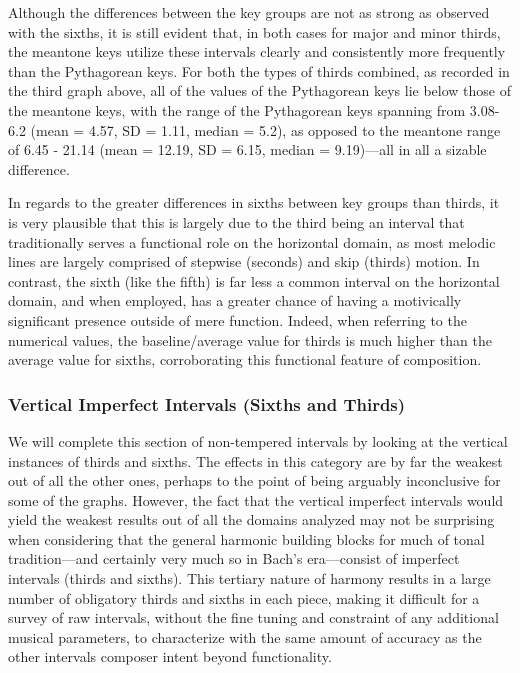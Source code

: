     Although the differences between the key groups are not as strong as
observed with the sixths, it is still evident that, in both cases for
major and minor thirds, the meantone keys utilize these intervals
clearly and consistently more frequently than the Pythagorean keys. For
both the types of thirds combined, as recorded in the third graph above,
all of the values of the Pythagorean keys lie below those of the
meantone keys, with the range of the Pythagorean keys spanning from
3.08-6.2 (mean = 4.57, SD = 1.11, median = 5.2), as opposed to the
meantone range of 6.45 - 21.14 (mean = 12.19, SD = 6.15, median =
9.19)---all in all a sizable difference.

In regards to the greater differences in sixths between key groups than
thirds, it is very plausible that this is largely due to the third being
an interval that traditionally serves a functional role on the
horizontal domain, as most melodic lines are largely comprised of
stepwise (seconds) and skip (thirds) motion. In contrast, the sixth
(like the fifth) is far less a common interval on the horizontal domain,
and when employed, has a greater chance of having a motivically
significant presence outside of mere function. Indeed, when referring to
the numerical values, the baseline/average value for thirds is much
higher than the average value for sixths, corroborating this functional
feature of composition.

\subsubsection{Vertical Imperfect Intervals (Sixths and
Thirds)}\label{vertical-imperfect-intervals-sixths-and-thirds}

We will complete this section of non-tempered intervals by looking at
the vertical instances of thirds and sixths. The effects in this
category are by far the weakest out of all the other ones, perhaps to
the point of being arguably inconclusive for some of the graphs.
However, the fact that the vertical imperfect intervals would yield the
weakest results out of all the domains analyzed may not be surprising
when considering that the general harmonic building blocks for much of
tonal tradition---and certainly very much so in Bach's
era---consist of imperfect intervals (thirds and sixths). This
tertiary nature of harmony results in a large number of obligatory
thirds and sixths in each piece, making it difficult for a survey of raw
intervals, without the fine tuning and constraint of any additional
musical parameters, to characterize with the same amount of accuracy as
the other intervals composer intent beyond functionality.

